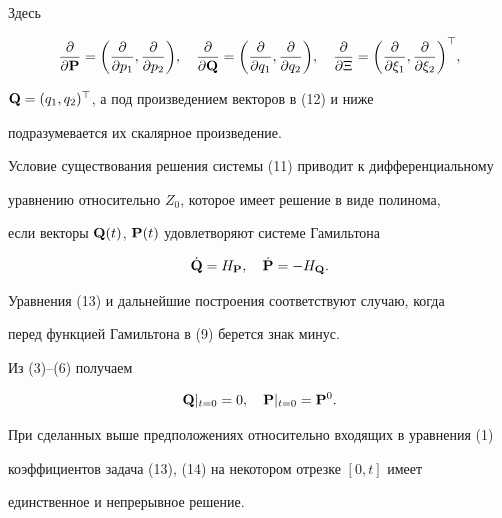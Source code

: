 Здесь 


$$ 


\frac{\partial}{\partial\BP}=\biggl( 


\frac{\partial}{\partial p_1},\frac{\partial}{\partial p_2}\biggr), 


\quad \frac{\partial}{\partial\BQ}=\biggl( 


\frac{\partial}{\partial q_1},\frac{\partial}{\partial q_2}\biggr), 


\quad \frac{\partial}{\partial\Xi}=\biggl( 


\frac{\partial}{\partial\xi_1},\frac{\partial}{\partial\xi_2} 


\biggr)^\top, 


$$ 


$\bold Q=(q_1,q_2)^\top$, а под произведением векторов в (12) и ниже 


подразумевается их скалярное произведение. 


 


Условие существования решения системы (11) приводит к дифференциальному 


уравнению относительно $Z_0$, которое имеет решение в виде полинома,


если векторы $\bold Q(t)$, $\bold P(t)$ удовлетворяют системе Гамильтона 


\begin{equation} 


\Dot{\BQ}=H_{\BP},\quad \Dot{\BP}=-H_{\BQ}. 


\end{equation} 


Уравнения (13) и дальнейшие построения соответствуют случаю, когда 


перед функцией Гамильтона в (9) берется знак минус. 


 


Из (3)--(6) получаем 


\begin{equation} 


\BQ|_{t=0}=0,\quad \BP|_{t=0}=\BP^0. 


\end{equation} 


При сделанных выше предположениях относительно входящих в уравнения (1) 


коэффициентов задача (13), (14) на некотором отрезке $[0,t]$ имеет 


единственное и непрерывное решение. 


